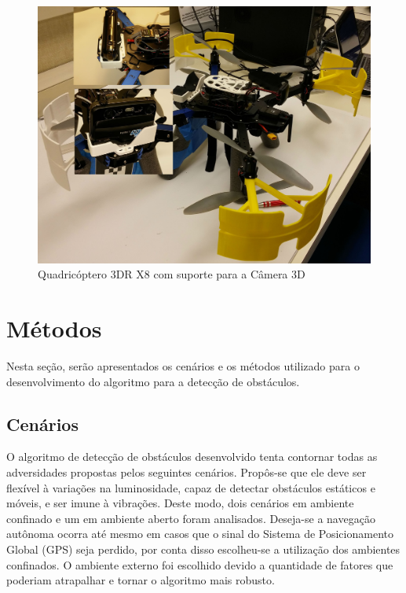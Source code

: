\begin{figure}[H]
	\centering
	\includegraphics[scale=0.10]{./Resources/quad_camera_support.jpg}
	\caption{Quadricóptero 3DR X8 com suporte para a Câmera 3D}
	\label{quad_camera_support}
\end{figure}


\section{Métodos}

Nesta seção, serão apresentados os cenários e os métodos utilizado para o desenvolvimento do algoritmo para a detecção de obstáculos.


\subsection{Cenários}

O algoritmo de detecção de obstáculos desenvolvido tenta contornar todas as adversidades propostas pelos seguintes cenários. Propôs-se que ele deve ser flexível à variações na luminosidade, capaz de detectar obstáculos estáticos e móveis, e ser imune à vibrações. Deste modo, dois cenários em ambiente confinado e um em ambiente aberto foram analisados. Deseja-se a navegação autônoma ocorra até mesmo em casos que o sinal do Sistema de Posicionamento Global (GPS) seja perdido, por conta disso escolheu-se a utilização dos ambientes confinados. O ambiente externo foi escolhido devido a quantidade de fatores que poderiam atrapalhar e tornar o algoritmo mais robusto.


